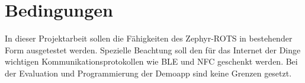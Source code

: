 \chapter{Bedingungen}
\label{chap:bedingungen}

In dieser Projektarbeit sollen die Fähigkeiten des Zephyr-ROTS in bestehender Form ausgetestet werden. Spezielle Beachtung soll  den für das Internet der Dinge wichtigen Kommunikationsprotokollen wie \ac{BLE} und \ac{NFC} geschenkt werden. Bei der Evaluation und Programmierung der Demoapp sind keine Grenzen gesetzt. 